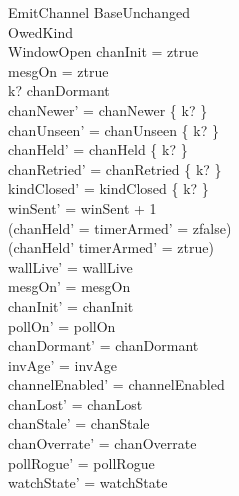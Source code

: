 \documentclass[a4paper,10pt,fleqn]{article}
\begin{document}
\begin{schema}{EmitChannel}
  BaseUnchanged \\
  OwedKind \\
  WindowOpen
  \where
  chanInit = ztrue \\
  mesgOn = ztrue \\
  k? \notin chanDormant \\
  chanNewer' = chanNewer \setminus \{ k? \} \\
  chanUnseen' = chanUnseen \setminus \{ k? \} \\
  chanHeld' = chanHeld \setminus \{ k? \} \\
  chanRetried' = chanRetried \setminus \{ k? \} \\
  kindClosed' = kindClosed \cup \{ k? \} \\
  winSent' = winSent + 1 \\
  (chanHeld' = \emptyset \implies timerArmed' = zfalse) \\
  (chanHeld' \neq \emptyset \implies timerArmed' = ztrue) \\
  wallLive' = wallLive \\
  mesgOn' = mesgOn \\
  chanInit' = chanInit \\
  pollOn' = pollOn \\
  chanDormant' = chanDormant \\
  invAge' = invAge \\
  channelEnabled' = channelEnabled \\
  chanLost' = chanLost \\
  chanStale' = chanStale \\
  chanOverrate' = chanOverrate \\
  pollRogue' = pollRogue \\
  watchState' = watchState
\end{schema}
\end{document}
